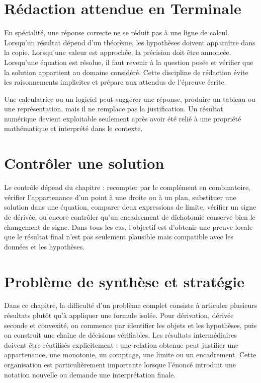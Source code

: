 \section{Rédaction attendue en Terminale}
En spécialité, une réponse correcte ne se réduit pas à une ligne de calcul. Lorsqu'un résultat dépend d'un théorème, les hypothèses doivent apparaître dans la copie. Lorsqu'une valeur est approchée, la précision doit être annoncée. Lorsqu'une équation est résolue, il faut revenir à la question posée et vérifier que la solution appartient au domaine considéré. Cette discipline de rédaction évite les raisonnements implicites et prépare aux attendus de l'épreuve écrite.

\begin{attention}
Une calculatrice ou un logiciel peut suggérer une réponse, produire un tableau ou une représentation, mais il ne remplace pas la justification. Un résultat numérique devient exploitable seulement après avoir été relié à une propriété mathématique et interprété dans le contexte.
\end{attention}

\section{Contrôler une solution}
Le contrôle dépend du chapitre : recompter par le complément en combinatoire, vérifier l'appartenance d'un point à une droite ou à un plan, substituer une solution dans une équation, comparer deux expressions de limite, vérifier un signe de dérivée, ou encore contrôler qu'un encadrement de dichotomie conserve bien le changement de signe. Dans tous les cas, l'objectif est d'obtenir une preuve locale que le résultat final n'est pas seulement plausible mais compatible avec les données et les hypothèses.

\section{Problème de synthèse et stratégie}

Dans ce chapitre, la difficulté d'un problème complet consiste à articuler plusieurs résultats plutôt qu'à appliquer une formule isolée. Pour dérivation, dérivée seconde et convexité, on commence par identifier les objets et les hypothèses, puis on construit une chaîne de décisions vérifiables. Les résultats intermédiaires doivent être réutilisés explicitement : une relation obtenue peut justifier une appartenance, une monotonie, un comptage, une limite ou un encadrement. Cette organisation est particulièrement importante lorsque l'énoncé introduit une notation nouvelle ou demande une interprétation finale.


